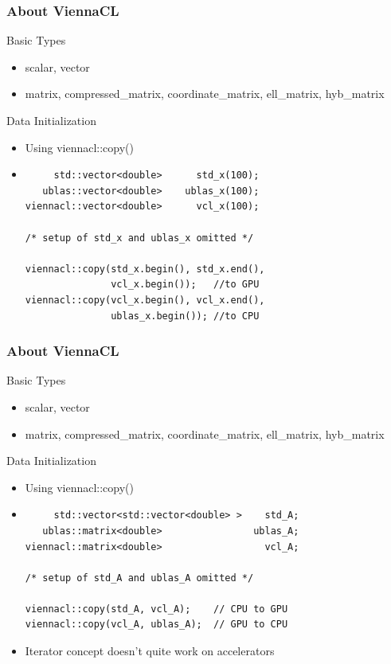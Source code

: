 \begin{frame}[fragile]
\frametitle{About ViennaCL}

 \begin{block}{Basic Types}
   \begin{itemize}
    \item scalar, vector
    \item matrix, compressed\_matrix, coordinate\_matrix, ell\_matrix, hyb\_matrix
   \end{itemize}
 \end{block}

 \begin{block}{Data Initialization}
    \begin{itemize}
     \item Using viennacl::copy() 
    \item  { 
  \begin{lstlisting}
     std::vector<double>      std_x(100);
   ublas::vector<double>    ublas_x(100);
viennacl::vector<double>      vcl_x(100);

/* setup of std_x and ublas_x omitted */

viennacl::copy(std_x.begin(), std_x.end(),
               vcl_x.begin());   //to GPU
viennacl::copy(vcl_x.begin(), vcl_x.end(),
               ublas_x.begin()); //to CPU
  \end{lstlisting} }

 \end{itemize}

 \end{block}
\end{frame}


\begin{frame}[fragile]
\frametitle{About ViennaCL}

 \begin{block}{Basic Types}
   \begin{itemize}
    \item scalar, vector
    \item matrix, compressed\_matrix, coordinate\_matrix, ell\_matrix, hyb\_matrix
   \end{itemize}
 \end{block}

 \begin{block}{Data Initialization}
    \begin{itemize}
     \item Using viennacl::copy() 
    \item  { 
  \begin{lstlisting}
     std::vector<std::vector<double> >    std_A;
   ublas::matrix<double>                ublas_A;
viennacl::matrix<double>                  vcl_A;

/* setup of std_A and ublas_A omitted */

viennacl::copy(std_A, vcl_A);    // CPU to GPU
viennacl::copy(vcl_A, ublas_A);  // GPU to CPU
  \end{lstlisting} }
    \item Iterator concept doesn't quite work on accelerators
 \end{itemize}

 \end{block}
\end{frame}

